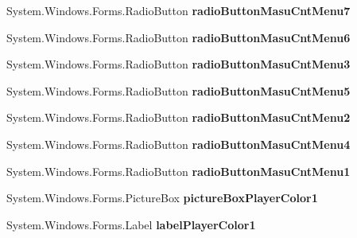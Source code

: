 \begin{DoxyCompactItemize}
System.\+Windows.\+Forms.\+Radio\+Button {\bfseries radio\+Button\+Masu\+Cnt\+Menu7}
\item 
\mbox{\label{class_reversi4color_form_1_1_setting_form_a1430938e15e2848a97c298c77539b07e}} 
System.\+Windows.\+Forms.\+Radio\+Button {\bfseries radio\+Button\+Masu\+Cnt\+Menu6}
\item 
\mbox{\label{class_reversi4color_form_1_1_setting_form_a209a5b6b4fd7e45ccb01044a9bb5a021}} 
System.\+Windows.\+Forms.\+Radio\+Button {\bfseries radio\+Button\+Masu\+Cnt\+Menu3}
\item 
\mbox{\label{class_reversi4color_form_1_1_setting_form_a5dca1fbb4a193f63f21a69723b1efa5f}} 
System.\+Windows.\+Forms.\+Radio\+Button {\bfseries radio\+Button\+Masu\+Cnt\+Menu5}
\item 
\mbox{\label{class_reversi4color_form_1_1_setting_form_ace2c0bd943ce144d9b1998f01ab5a8ea}} 
System.\+Windows.\+Forms.\+Radio\+Button {\bfseries radio\+Button\+Masu\+Cnt\+Menu2}
\item 
\mbox{\label{class_reversi4color_form_1_1_setting_form_a4a579da2fbdf31073afddbfda2bd2d4a}} 
System.\+Windows.\+Forms.\+Radio\+Button {\bfseries radio\+Button\+Masu\+Cnt\+Menu4}
\item 
\mbox{\label{class_reversi4color_form_1_1_setting_form_ac614c48c4321bb8cf831dd7a54932a69}} 
System.\+Windows.\+Forms.\+Radio\+Button {\bfseries radio\+Button\+Masu\+Cnt\+Menu1}
\item 
\mbox{\label{class_reversi4color_form_1_1_setting_form_a7f66e0c798ab819475503fb5b7457317}} 
System.\+Windows.\+Forms.\+Picture\+Box {\bfseries picture\+Box\+Player\+Color1}
\item 
\mbox{\label{class_reversi4color_form_1_1_setting_form_ae6d5c4592e65933606d7f5d5f6e07f34}} 
System.\+Windows.\+Forms.\+Label {\bfseries label\+Player\+Color1}
\item 

\end{DoxyCompactItemize}
